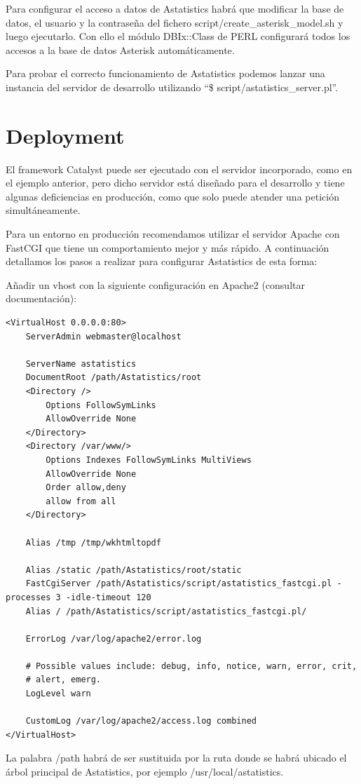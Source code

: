 \documentclass[spanish,12pt]{book}
\begin{document}
Para configurar el acceso a datos de Astatistics habrá que modificar la base de datos, el usuario y la contraseña del fichero script/create\_asterisk\_model.sh y luego ejecutarlo. Con ello el módulo DBIx::Class de PERL configurará todos los accesos a la base de datos Asterisk automáticamente.

Para probar el correcto funcionamiento de Astatistics podemos lanzar una instancia del servidor de desarrollo utilizando ``\$ script/astatistics\_server.pl''.

\section{Deployment}
El framework Catalyst puede ser ejecutado con el servidor incorporado, como en el ejemplo anterior, pero dicho servidor está diseñado para el desarrollo y tiene algunas deficiencias en producción, como que solo puede atender una petición simultáneamente.

Para un entorno en producción recomendamos utilizar el servidor Apache con FastCGI que tiene un comportamiento mejor y más rápido. A continuación detallamos los pasos a realizar para configurar Astatistics de esta forma:

Añadir un vhost con la siguiente configuración en Apache2 (consultar documentación):

\begin{lstlisting}
<VirtualHost 0.0.0.0:80>
	ServerAdmin webmaster@localhost
	
	ServerName astatistics
	DocumentRoot /path/Astatistics/root
	<Directory />
		Options FollowSymLinks
		AllowOverride None
	</Directory>
	<Directory /var/www/>
		Options Indexes FollowSymLinks MultiViews
		AllowOverride None
		Order allow,deny
		allow from all
	</Directory>

	Alias /tmp /tmp/wkhtmltopdf

	Alias /static /path/Astatistics/root/static
	FastCgiServer /path/Astatistics/script/astatistics_fastcgi.pl -processes 3 -idle-timeout 120
	Alias /	/path/Astatistics/script/astatistics_fastcgi.pl/

	ErrorLog /var/log/apache2/error.log

	# Possible values include: debug, info, notice, warn, error, crit,
	# alert, emerg.
	LogLevel warn

	CustomLog /var/log/apache2/access.log combined
</VirtualHost>
\end{lstlisting}

La palabra /path habrá de ser sustituida por la ruta donde se habrá ubicado el árbol principal de Astatistics, por ejemplo /usr/local/astatistics.
\end{document}

